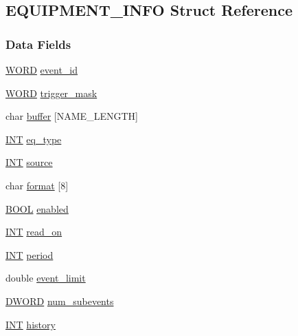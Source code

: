 \subsection{EQUIPMENT\_\-INFO Struct Reference}
\label{structEQUIPMENT__INFO}
\subsubsection*{Data Fields}
\begin{DoxyCompactItemize}
\item 
\hyperlink{vt2_8h_a2b0e863dadf920709ec53d9088ee7c91}{WORD} \hyperlink{structEQUIPMENT__INFO_a83d6e0d3f9bb5990400d40e84a2be378}{event\_\-id}
\item 
\hyperlink{vt2_8h_a2b0e863dadf920709ec53d9088ee7c91}{WORD} \hyperlink{structEQUIPMENT__INFO_a5744b359b07fc1963dd1a88210d28e6b}{trigger\_\-mask}
\item 
char \hyperlink{structEQUIPMENT__INFO_a0666cb14ec61ae2c4f535b76c9401ae1}{buffer} \mbox{[}NAME\_\-LENGTH\mbox{]}
\item 
\hyperlink{vppg_8h_a392e62da233ed3e2f7c3fd4f487a3896}{INT} \hyperlink{structEQUIPMENT__INFO_a5d2b5c1a08c8312e86963499122d3c06}{eq\_\-type}
\item 
\hyperlink{vppg_8h_a392e62da233ed3e2f7c3fd4f487a3896}{INT} \hyperlink{structEQUIPMENT__INFO_a345e65d8874f6b968bedc00e76d4f431}{source}
\item 
char \hyperlink{structEQUIPMENT__INFO_a60d08f3eadb2b1f809d06d7a64b0bc5e}{format} \mbox{[}8\mbox{]}
\item 
\hyperlink{vt2_8h_a239c7f0d40651c3e419c5b9651507d14}{BOOL} \hyperlink{structEQUIPMENT__INFO_a512d7966d5f96f8c75fec4ba1b1946c4}{enabled}
\item 
\hyperlink{vppg_8h_a392e62da233ed3e2f7c3fd4f487a3896}{INT} \hyperlink{structEQUIPMENT__INFO_a5079d6cb8b770782e0bce5046f476996}{read\_\-on}
\item 
\hyperlink{vppg_8h_a392e62da233ed3e2f7c3fd4f487a3896}{INT} \hyperlink{structEQUIPMENT__INFO_af7f674490636b6f9736fb680201001c2}{period}
\item 
double \hyperlink{structEQUIPMENT__INFO_a4f67b0a6bdc9fd382ea981f6a9dfdfcf}{event\_\-limit}
\item 
\hyperlink{vt2_8h_a798af1e30bc65f319c1a246cecf59e39}{DWORD} \hyperlink{structEQUIPMENT__INFO_ade7b61b85a73ed33545caf31b706acd3}{num\_\-subevents}
\item 
\hyperlink{vppg_8h_a392e62da233ed3e2f7c3fd4f487a3896}{INT} \hyperlink{structEQUIPMENT__INFO_a2740dd481bbbb7c8e417b5818ff8e064}{history}

\end{DoxyCompactItemize}
